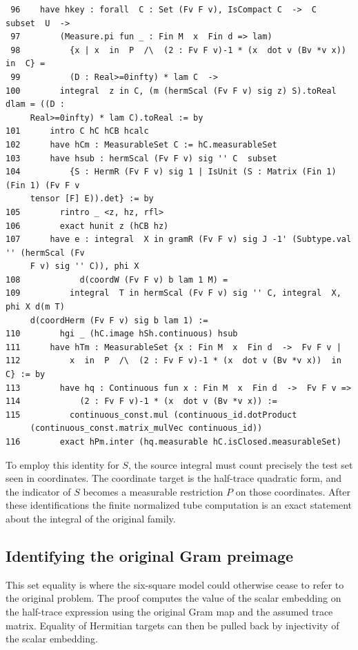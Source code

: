 \documentclass[12pt,letterpaper]{article}
\begin{document}
\par
{\fontsize{9.2}{11.2}\selectfont\begin{verbatim}
 96    have hkey : forall  C : Set (Fv F v), IsCompact C  ->  C  subset  U  ->
 97        (Measure.pi fun _ : Fin M  x  Fin d => lam)
 98          {x | x  in  P  /\  (2 : Fv F v)-1 * (x  dot v (Bv *v x))  in  C} =
 99          (D : Real>=0infty) * lam C  ->
100        integral  z in C, (m (hermScal (Fv F v) sig z) S).toReal dlam = ((D :
     Real>=0infty) * lam C).toReal := by
101      intro C hC hCB hcalc
102      have hCm : MeasurableSet C := hC.measurableSet
103      have hsub : hermScal (Fv F v) sig '' C  subset
104          {S : HermR (Fv F v) sig 1 | IsUnit (S : Matrix (Fin 1) (Fin 1) (Fv F v
     tensor [F] E)).det} := by
105        rintro _ <z, hz, rfl>
106        exact hunit z (hCB hz)
107      have e : integral  X in gramR (Fv F v) sig J -1' (Subtype.val '' (hermScal (Fv
     F v) sig '' C)), phi X
108            d(coordW (Fv F v) b lam 1 M) =
109          integral  T in hermScal (Fv F v) sig '' C, integral  X, phi X d(m T)
     d(coordHerm (Fv F v) sig b lam 1) :=
110        hgi _ (hC.image hSh.continuous) hsub
111      have hTm : MeasurableSet {x : Fin M  x  Fin d  ->  Fv F v |
112          x  in  P  /\  (2 : Fv F v)-1 * (x  dot v (Bv *v x))  in  C} := by
113        have hq : Continuous fun x : Fin M  x  Fin d  ->  Fv F v =>
114            (2 : Fv F v)-1 * (x  dot v (Bv *v x)) :=
115          continuous_const.mul (continuous_id.dotProduct
     (continuous_const.matrix_mulVec continuous_id))
116        exact hPm.inter (hq.measurable hC.isClosed.measurableSet)
\end{verbatim}}
To employ this identity for $S$, the source integral must count precisely the test set seen in coordinates. The coordinate target is the half-trace quadratic form, and the indicator of $S$ becomes a measurable restriction $P$ on those coordinates. After these identifications the finite normalized tube computation is an exact statement about the integral of the original family.
\clearpage{}\subsection*{Identifying the original Gram preimage}\label{extract-FourContact117}
This set equality is where the six-square model could otherwise cease to refer to the original problem. The proof computes the value of the scalar embedding on the half-trace expression using the original Gram map and the assumed trace matrix. Equality of Hermitian targets can then be pulled back by injectivity of the scalar embedding.
\end{document}
